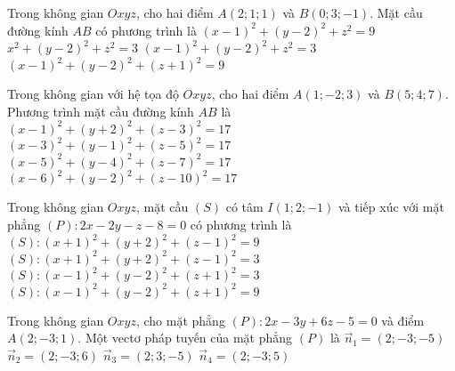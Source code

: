 \begin{ex}%
	Trong không gian $Oxyz$, cho hai điểm $A(2;1;1)$ và $B(0;3;-1)$. Mặt cầu đường kính $AB$ có phương trình là
	\choice
	{$(x-1)^2+(y-2)^2+z^2=9$}
	{$x^2+(y-2)^2+z^2=3$}
	{\True$(x-1)^2+(y-2)^2+z^2=3$}
	{$(x-1)^2+(y-2)^2+(z+1)^2=9$}
\end{ex}

\begin{ex}%
	Trong không gian với hệ tọa độ $Oxyz$, cho hai điểm $A(1;-2;3)$ và $B(5;4;7)$. Phương trình mặt cầu đường kính $AB$ là
	\choice
	{$\left(x-1\right)^2+\left(y+2\right)^2+\left(z-3\right)^2=17$}
	{\True $\left(x-3\right)^2+\left(y-1\right)^2+\left(z-5\right)^2=17$}
	{$\left(x-5\right)^2+\left(y-4\right)^2+\left(z-7\right)^2=17$}
	{$\left(x-6\right)^2+\left(y-2\right)^2+\left(z-10\right)^2=17$}
\end{ex}

%

\begin{ex}%
	Trong không gian $Oxyz$, mặt cầu $(S)$ có tâm $I(1; 2;-1)$ và tiếp xúc với mặt phẳng $(P)\colon 2x-2y-z-8=0$ có phương trình là
	\choice
	{$(S)\colon (x+1)^2+(y+2)^2+(z-1)^2=9$}
	{$(S)\colon (x+1)^2+(y+2)^2+(z-1)^2=3$}
	{$(S)\colon (x-1)^2+(y-2)^2+(z+1)^2=3$}
	{\True $(S)\colon (x-1)^2+(y-2)^2+(z+1)^2=9$}
\end{ex}

%

\begin{ex}%
	Trong không gian $Oxyz$, cho mặt phẳng $(P)\colon 2x-3y+6z-5=0$ và điểm $A(2;-3; 1)$. Một vectơ pháp tuyến của mặt phẳng $(P)$ là
	\choice
	{$\overrightarrow{n}_1=(2;-3;-5)$}
	{\True $\overrightarrow{n}_2=(2;-3; 6)$}
	{$\overrightarrow{n}_3=(2; 3;-5)$}
	{$\overrightarrow{n}_4=(2;-3; 5)$}
\end{ex}

